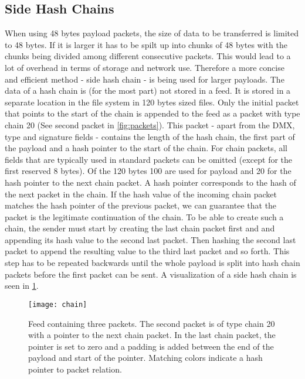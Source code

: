 \subsection{Side Hash Chains}
\label{sec:sidechain}
When using 48 bytes payload packets, the size of data to be transferred is limited to 48 bytes. If it is larger it has to be spilt up into chunks of 48 bytes with the chunks being divided among different consecutive packets. This would lead to a lot of overhead in terms of storage and network use. Therefore a more concise and efficient method - side hash chain - is being used for larger payloads. The data of a hash chain is (for the most part) not stored in a feed. It is stored in a separate location in the file system in 120 bytes sized files. Only the initial packet that points to the start of the chain is appended to the feed as a packet with type chain 20 (See second packet in \cref{fig:packets}). This packet - apart from the DMX, type and signature fields - contains the length of the hash chain, the first part of the payload and a hash pointer to the start of the chain. For chain packets, all fields that are typically used in standard packets can be omitted (except for the first reserved 8 bytes). Of the 120 bytes 100 are used for payload and 20 for the hash pointer to the next chain packet. A hash pointer corresponds to the hash of the next packet in the chain. If the hash value of the incoming chain packet matches the hash pointer of the previous packet, we can guarantee that the packet is the legitimate continuation of the chain. To be able to create such a chain, the sender must start by creating the last chain packet first and and appending its hash value to the second last packet. Then hashing the second last packet to append the resulting value to the third last packet and so forth. This step has to be repeated backwards until the whole payload is split into hash chain packets before the first packet can be sent. A visualization of a side hash chain is seen in \cref{fig:chain}. \\
\begin{figure}
\centering
\texttt{[image: chain]}
\caption{Feed containing three packets. The second packet is of type chain 20 with a pointer to the next chain packet. In the last chain packet, the pointer is set to zero and a padding is added between the end of the payload and start of the pointer. Matching colors indicate a hash pointer to packet relation.}
\label{fig:chain}
\end{figure}

